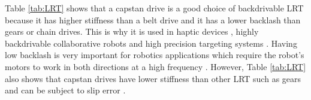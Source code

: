 \documentclass[10pt,cleanfoot]{asme2ej}
\begin{document}
\par Table \ref{tab:LRT} shows that a capstan drive is a good choice of backdrivable LRT because it has higher stiffness than a belt drive and it has a lower backlash than gears or chain drives. This is why it is used in haptic devices \cite{perret2014advantages}\cite{baser2013kinematic}, highly backdrivable collaborative robots \cite{townsend1988effect}\cite{rooks2006harmonious}\cite{phan2014guided} and high precision targeting systems \cite{lu2015development}\cite{lu2012non}\cite{lu2013transmission}\cite{xie2019analytical}. Having low backlash is very important for  robotics applications which require the robot's motors to work in both directions at a high frequency \cite{brooks1990telerobotic}\cite{gealy2019quasi}. However, Table \ref{tab:LRT} also shows that capstan drives have lower stiffness than other LRT such as gears and can be subject to slip error \cite{lu2013transmission}\cite{baser2010theoretical}.\par
\end{document}
